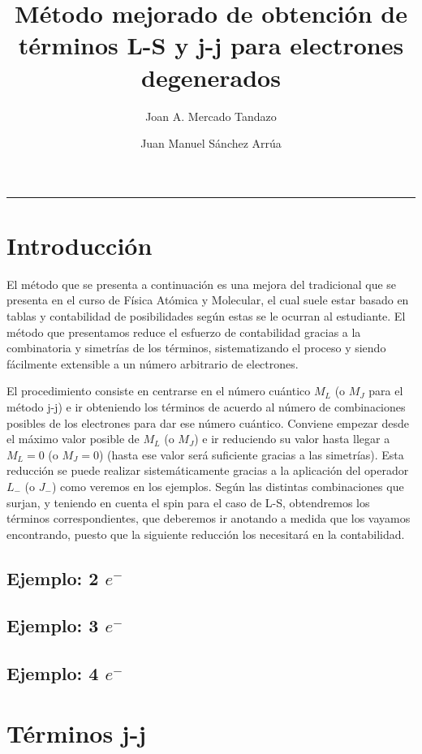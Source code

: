 \documentclass[12pt]{article}
\title{Método mejorado de obtención de términos L-S y j-j para electrones degenerados}
\author{Joan A. Mercado Tandazo \and Juan Manuel Sánchez Arrúa}
\begin{document}
\maketitle
\hrule{\textwidth}
\resetnumpagetitle
\tableofcontents
\resetnumpagetitle
\pagestyle{academic} 
\section{Introducción} 
El método que se presenta a continuación es una mejora del tradicional que se presenta en el curso de Física Atómica y Molecular, el cual suele estar basado en tablas y contabilidad de posibilidades según estas se le ocurran al estudiante. El método que presentamos reduce el esfuerzo de contabilidad gracias a la combinatoria y simetrías de los términos, sistematizando el proceso y siendo fácilmente extensible a un número arbitrario de electrones.\par
El procedimiento consiste en centrarse en el número cuántico $M_{L}$ (o $M_{J}$ para el método j-j) e ir obteniendo los términos de acuerdo al número de combinaciones posibles de los electrones para dar ese número cuántico. Conviene empezar desde el máximo valor posible de $M_{L}$ (o $M_{J}$) e ir reduciendo su valor hasta llegar a $M_{L}=0$ (o $M_{J}=0$) (hasta ese valor será suficiente gracias a las simetrías). Esta reducción se puede realizar sistemáticamente gracias a la aplicación del operador $L_{-}$ (o $J_{-}$) como veremos en los ejemplos. Según las distintas combinaciones que surjan, y teniendo en cuenta el spin para el caso de L-S, obtendremos los términos correspondientes, que deberemos ir anotando a medida que los vayamos encontrando, puesto que la siguiente reducción los necesitará en la contabilidad. 




\subsection{Ejemplo: 2 \texorpdfstring{$e^{-}$}{e^-}}



\subsection{Ejemplo: 3 \texorpdfstring{$e^{-}$}{e^-}} 



\subsection{Ejemplo: 4 \texorpdfstring{$e^{-}$}{e^-}}


\section{Términos j-j}
\end{document}
